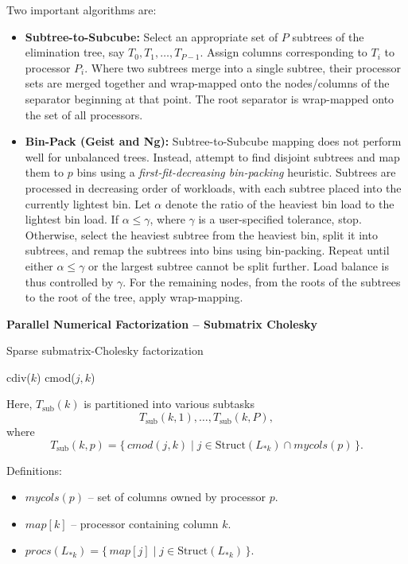 \documentclass[12pt]{book}
\begin{document}
Two important algorithms are:
\begin{itemize}
    \item \textbf{Subtree-to-Subcube:}  
    Select an appropriate set of $P$ subtrees of the elimination tree, say $T_0, T_1, \ldots, T_{P-1}$.  
    Assign columns corresponding to $T_i$ to processor $P_i$.  
    Where two subtrees merge into a single subtree, their processor sets are merged together and wrap-mapped onto the nodes/columns of the separator beginning at that point.  
    The root separator is wrap-mapped onto the set of all processors.
    
    \item \textbf{Bin-Pack (Geist and Ng):}  
    Subtree-to-Subcube mapping does not perform well for unbalanced trees.  
    Instead, attempt to find disjoint subtrees and map them to $p$ bins using a \emph{first-fit-decreasing bin-packing} heuristic.  
    Subtrees are processed in decreasing order of workloads, with each subtree placed into the currently lightest bin.
    Let $\alpha$ denote the ratio of the heaviest bin load to the lightest bin load.  
    If $\alpha \leq \gamma$, where $\gamma$ is a user-specified tolerance, stop.  
    Otherwise, select the heaviest subtree from the heaviest bin, split it into subtrees, and remap the subtrees into bins using bin-packing.  
    Repeat until either $\alpha \leq \gamma$ or the largest subtree cannot be split further.  
    Load balance is thus controlled by $\gamma$.  
    For the remaining nodes, from the roots of the subtrees to the root of the tree, apply wrap-mapping.
\end{itemize}

\noindent \textbf{Parallel Numerical Factorization – Submatrix Cholesky}

\begin{algorithm}[H]
\caption{Sparse submatrix-Cholesky factorization}
\begin{algorithmic}[1]
    \State cdiv($k$)
     
        \State cmod($j,k$)
    \EndFor
\EndFor
\end{algorithmic}
\end{algorithm}

Here, $T_{\text{sub}}(k)$ is partitioned into various subtasks  
\[
T_{\text{sub}}(k,1), \ldots, T_{\text{sub}}(k,P),
\]
where
\[
T_{\text{sub}}(k,p) = \{\, cmod(j,k) \;|\; j \in \text{Struct}(L_{*k}) \cap mycols(p)\,\}.
\]

Definitions:
\begin{itemize}
    \item $mycols(p)$ – set of columns owned by processor $p$.
    \item $map[k]$ – processor containing column $k$.
    \item $procs(L_{*k}) = \{\, map[j] \mid j \in \text{Struct}(L_{*k}) \,\}$.
\end{itemize}
\end{document}
